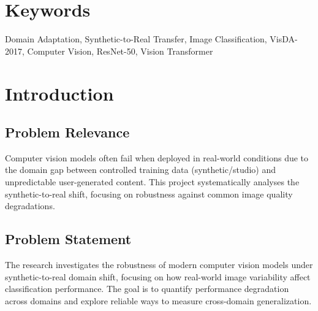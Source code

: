 \documentclass[a4paper,12pt]{extarticle}
\begin{document}
\section*{Keywords}
Domain Adaptation, Synthetic-to-Real Transfer, Image Classification, VisDA-2017, Computer Vision, ResNet-50, Vision Transformer

\newpage

\section{Introduction}
\label{sec:introduction}

\subsection{Problem Relevance}
Computer vision models often fail when deployed in real-world conditions due to the domain gap between controlled
training data (synthetic/studio) and unpredictable user-generated content. This project systematically analyses the
synthetic-to-real shift, focusing on robustness against common image quality degradations.

\subsection{Problem Statement}
The research investigates the robustness of modern computer vision models under synthetic-to-real domain shift,
focusing on how real-world image variability affect classification performance. The goal is to quantify performance
degradation across domains and explore reliable ways to measure cross-domain generalization.
\end{document}
